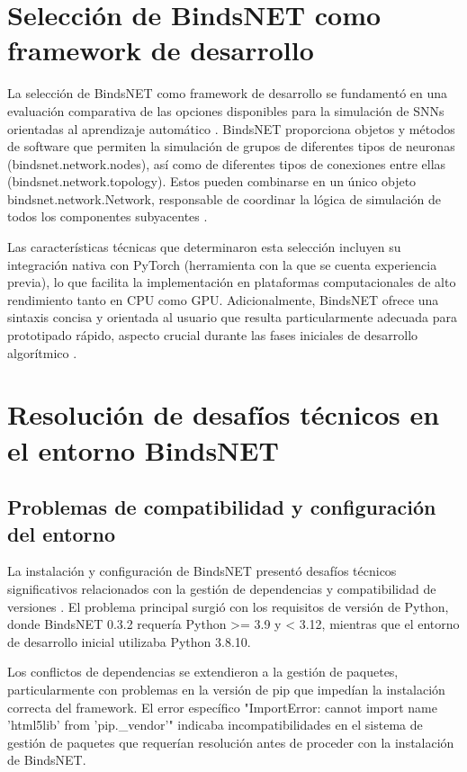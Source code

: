 \section{Selección de BindsNET como framework de desarrollo}

La selección de BindsNET como framework de desarrollo se fundamentó en una evaluación comparativa de las opciones disponibles para la simulación de SNNs orientadas al aprendizaje automático \cite{Hazan2018_BindsNET}. BindsNET proporciona objetos y métodos de software que permiten la simulación de grupos de diferentes tipos de neuronas (bindsnet.network.nodes), así como de diferentes tipos de conexiones entre ellas (bindsnet.network.topology). Estos pueden combinarse en un único objeto bindsnet.network.Network, responsable de coordinar la lógica de simulación de todos los componentes subyacentes \cite{bindsnet_docs}.

Las características técnicas que determinaron esta selección incluyen su integración nativa con PyTorch (herramienta con la que se cuenta experiencia previa), lo que facilita la implementación en plataformas computacionales de alto rendimiento tanto en CPU como GPU. Adicionalmente, BindsNET ofrece una sintaxis concisa y orientada al usuario que resulta particularmente adecuada para prototipado rápido, aspecto crucial durante las fases iniciales de desarrollo algorítmico \cite{bindsnet_docs}.

\section{Resolución de desafíos técnicos en el entorno BindsNET}
\subsection{Problemas de compatibilidad y configuración del entorno}

La instalación y configuración de BindsNET presentó desafíos técnicos significativos relacionados con la gestión de dependencias y compatibilidad de versiones . El problema principal surgió con los requisitos de versión de Python, donde BindsNET 0.3.2 requería Python >= 3.9 y < 3.12, mientras que el entorno de desarrollo inicial utilizaba Python 3.8.10.

Los conflictos de dependencias se extendieron a la gestión de paquetes, particularmente con problemas en la versión de pip que impedían la instalación correcta del framework. El error específico "ImportError: cannot import name 'html5lib' from 'pip.\_vendor'" indicaba incompatibilidades en el sistema de gestión de paquetes que requerían resolución antes de proceder con la instalación de BindsNET.

